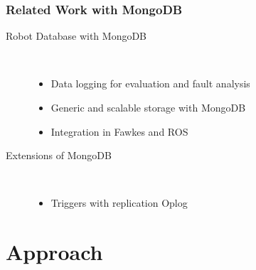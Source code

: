 \begin{frame}
  \frametitle{Related Work with MongoDB}
  \begin{description}
  \item[Robot Database with MongoDB~\cite{RoboDB}]%
                \hfill \\
    \begin{itemize}
    \item Data logging for evaluation and fault analysis
    \item Generic and scalable storage with MongoDB
    \item Integration in Fawkes and ROS
    \end{itemize}
\bigskip
  \item[Extensions of  MongoDB]%
                \hfill \\
    \begin{itemize}
    \item Triggers with replication Oplog~\cite{mongodb-trigger}
    \end{itemize}
  \end{description}
\end{frame}


\section{Approach}
\begin{frame}[plain]
  \tableofcontents[currentsection]
\end{frame}
\addtocounter{framenumber}{-1}


